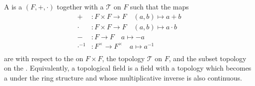 \begin{definition}  \label{definition:topological_field}
    A  is a  $(F,+,\cdot)$ together with a  $\mathcal{T}$ on $F$ such that the maps
    \begin{align*}
    +&: F \times F \to F  \quad (a,b) \mapsto a+b \\ 
    \cdot&: F \times F \to F  \quad (a,b) \mapsto a \cdot b \\ 
    -&: F \to F  \quad a \mapsto -a \\
    \cdot^{-1}&: F^\times \to F^\times  \quad a \mapsto a^{-1} \\
    \end{align*}
    are  with respect to the  on $F \times F$, the topology $\mathcal{T}$ on $F$, and the subset topology on the . Equivalently, a topological field is a field with a topology which becomes a  under the ring structure and whose multiplicative inverse is also continuous.
\end{definition}

